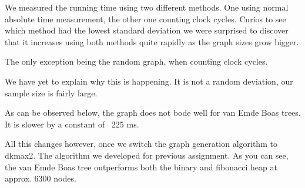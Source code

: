 We measured the running time using two different methods. One using normal absolute time measurement, the other one counting clock cycles. Curios to see which method had the lowest standard deviation we were surprised to discover that it increases using both methods quite rapidly as the graph sizes grow bigger.\newline


The only exception being the random graph, when counting clock cycles.\newline


We have yet to explain why this is happening. It is not a random deviation, our sample size is fairly large.\newline


As can be observed below, the graph does not bode well for van Emde Boas trees. It is slower by a constant of ~225 ms.\newline


All this changes however, once we switch the graph generation algorithm to dkmax2. The algorithm we developed for previous assignment. As you can see, the van Emde Boas tree outperforms both the binary and fibonacci heap at approx. 6300 nodes.\newline

